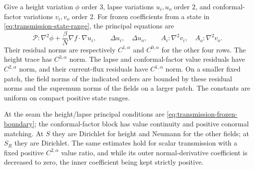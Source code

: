 \begin{lemma}
\label{lem:transmission-schauder}
Give a height variation $\phi$ order $3$, lapse variations $u_i,u_o$
order $2$, and conformal-factor variations $v_i,v_o$ order $2$.
For frozen coefficients from a state in
\eqref{eq:transmission-state-range}, the principal equations are
\begin{equation}
 \mathcal P:\nabla^2\phi
       +\frac\beta N\nabla f\cdot\nabla u_i,\qquad
 \Delta u_i,\quad\Delta u_o,\qquad
 A_i:\nabla^2v_i,\quad A_o:\nabla^2v_o.
 \label{eq:transmission-principal-rows}
\end{equation}
Their residual norms are respectively $C^{1,\alpha}$ and
$C^{0,\alpha}$ for the other four rows.  The height trace has
$C^{3,\alpha}$ norm.  The lapse and conformal-factor value residuals
have $C^{2,\alpha}$ norm, and their current-flux residuals have
$C^{1,\alpha}$ norm.  On a smaller fixed patch, the field norms of
the indicated orders are bounded by these residual norms and the
supremum norms of the fields on a larger patch.  The constants are
uniform on compact positive state ranges.

At the seam the height/lapse principal conditions are
\eqref{eq:transmission-frozen-boundary}; the conformal-factor block
has value continuity and positive conormal matching.  At $S$ they
are Dirichlet for height and Neumann for the other fields; at $S_R$
they are Dirichlet.  The same estimates hold for scalar transmission
with a fixed positive $C^{2,\alpha}$ value ratio, and while its outer
normal-derivative coefficient is decreased to zero, the inner
coefficient being kept strictly positive.
\end{lemma}

